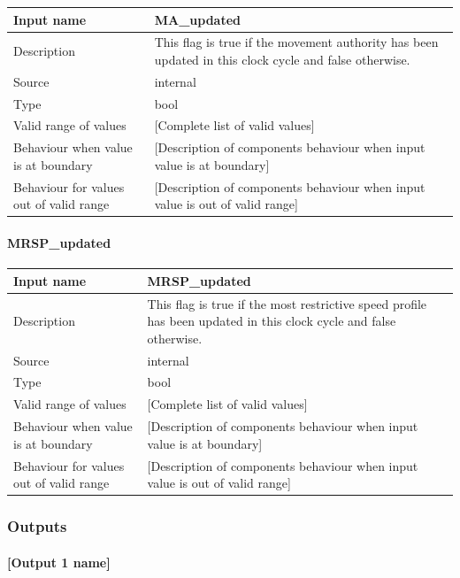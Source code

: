 \begin{longtable}{p{}p{}}
\toprule
Input name				& MA\_updated \\
\midrule
Description				& This flag is true if the movement authority has been updated in this clock cycle and false otherwise. \\
\midrule
Source					& internal \\ 
\midrule
Type					& bool \\
\midrule
Valid range of values	& [Complete list of valid values] \\
\midrule
Behaviour when value is at boundary	& [Description of components behaviour when input value is at boundary] \\
\midrule
Behaviour for values out of valid range	& [Description of components behaviour when input value is out of valid range] \\
\bottomrule
\end{longtable}


\paragraph{MRSP\_updated}

\begin{longtable}{p{}p{}}
\toprule
Input name				& MRSP\_updated \\
\midrule
Description				& This flag is true if the most restrictive speed profile has been updated in this clock cycle and false otherwise. \\
\midrule
Source					& internal \\ 
\midrule
Type					& bool \\
\midrule
Valid range of values	& [Complete list of valid values] \\
\midrule
Behaviour when value is at boundary	& [Description of components behaviour when input value is at boundary] \\
\midrule
Behaviour for values out of valid range	& [Description of components behaviour when input value is out of valid range] \\
\bottomrule
\end{longtable}


\subsubsection{Outputs}\label{s:template_outputs}

\paragraph{[Output 1 name]}

